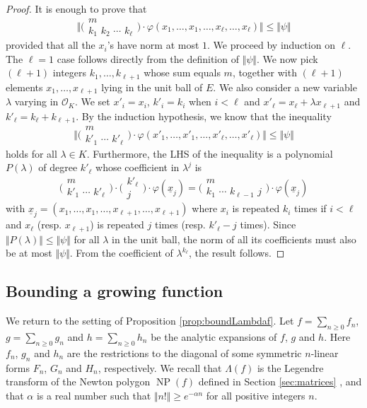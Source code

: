 \documentclass{sig-alternate-2013}
\DeclareMathOperator{\NP}{NP}
\renewcommand{\O}{\mathcal O}
\def\binom#1#2{\Big(\begin{array}{cc} #1 \\ #2 \end{array}\Big)}
\begin{document}
\begin{proof}
It is enough to prove that
$$\Big\Vert \binom m {k_1 \,\, k_2 \,\, \cdots \,\, k_\ell} \cdot
\varphi(x_1, \ldots, x_1, \ldots, x_\ell, \ldots,
x_\ell) \Big\Vert \leq \Vert \psi \Vert$$
provided that all the $x_i$'s have norm at most $1$. We proceed by 
induction on 
$\ell$. The $\ell = 1$ case follows directly from
the definition of $\Vert \psi \Vert$. 
We now pick $(\ell+1)$ integers $k_1, \ldots, k_{\ell+1}$ whose sum 
equals $m$, together with $(\ell+1)$ elements $x_1, \ldots, x_{\ell+1}$
lying in the unit ball of $E$.
We also consider a new variable $\lambda$ varying in
$\O_K$. We set $x'_i = x_i$, $k'_i = k_i$ when $i < \ell$ and $x'_\ell 
= x_\ell + \lambda x_{\ell+1}$ and $k'_\ell = k_\ell + k_{\ell+1}$. By the 
induction hypothesis, we know that the inequality
$$\Big\Vert \binom m {k'_1 \,\, \cdots \,\, k'_\ell} \cdot
\varphi(x'_1, \ldots, x'_1, \ldots, x'_\ell, \ldots, x'_\ell) \Big\Vert
\leq \Vert \psi \Vert$$
holds for all $\lambda \in K$. Furthermore, the LHS of the inequality
is a polynomial $P(\lambda)$ of degree $k'_\ell$ whose coefficient in 
$\lambda^j$ is
$$\binom m {k'_1 \,\, \cdots \,\, k'_\ell} \cdot
\binom {k'_\ell} {j} \cdot
\varphi(\underline x_j) = 
\binom m {k_1 \,\, \cdots \,\, k_{\ell-1} \,\, j} \cdot
\varphi(\underline x_j)$$
with
$\underline x_j = (x_1, \ldots, x_1, \ldots, x_{\ell+1}, \ldots, 
x_{\ell+1})$
where $x_i$ is repeated $k_i$ times if $i < \ell$ and $x_\ell$ 
(resp. $x_{\ell+1}$) is repeated $j$ times (resp. $k'_\ell - j$ times).
Since $\Vert P(\lambda) \Vert \leq \Vert \psi \Vert$ for all $\lambda$ in 
the unit ball, the norm of all its coefficients must also be at most $\Vert \psi
\Vert$. From the coefficient of $\lambda^{k_\ell}$, the result follows.
\end{proof}

\subsection{Bounding a growing function}

We return to the setting of Proposition \ref{prop:boundLambdaf}.
Let $f = \sum_{n \geq 0} f_n$, $g = \sum_{n \geq 0} g_n$ and
$h = \sum_{n \geq 0} h_n$ be the analytic expansions of
$f$, $g$ and $h$.
Here $f_n$, $g_n$ and $h_n$ are the restrictions to the diagonal of 
some symmetric $n$-linear forms $F_n$, $G_n$ and $H_n$, respectively.
We recall that $\Lambda(f)$ 
is the Legendre transform of the Newton polygon $\NP(f)$ defined in Section \ref{sec:matrices}
\cite[Proposition 3.9]{caruso-roe-vaccon:14a}, and that $\alpha$ is a
real number such that $\Vert n! \Vert \geq e^{-\alpha n}$ for all positive integers $n$.
\end{document}
